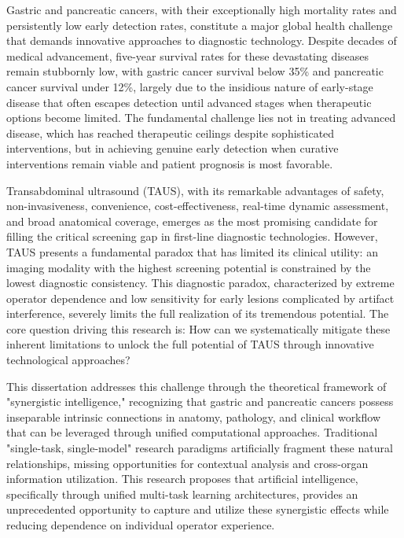 
Gastric and pancreatic cancers, with their exceptionally high mortality rates and persistently low early detection rates, constitute a major global health challenge that demands innovative approaches to diagnostic technology. Despite decades of medical advancement, five-year survival rates for these devastating diseases remain stubbornly low, with gastric cancer survival below 35\% and pancreatic cancer survival under 12\%, largely due to the insidious nature of early-stage disease that often escapes detection until advanced stages when therapeutic options become limited. The fundamental challenge lies not in treating advanced disease, which has reached therapeutic ceilings despite sophisticated interventions, but in achieving genuine early detection when curative interventions remain viable and patient prognosis is most favorable.

Transabdominal ultrasound (TAUS), with its remarkable advantages of safety, non-invasiveness, convenience, cost-effectiveness, real-time dynamic assessment, and broad anatomical coverage, emerges as the most promising candidate for filling the critical screening gap in first-line diagnostic technologies. However, TAUS presents a fundamental paradox that has limited its clinical utility: an imaging modality with the highest screening potential is constrained by the lowest diagnostic consistency. This diagnostic paradox, characterized by extreme operator dependence and low sensitivity for early lesions complicated by artifact interference, severely limits the full realization of its tremendous potential. The core question driving this research is: How can we systematically mitigate these inherent limitations to unlock the full potential of TAUS through innovative technological approaches?

This dissertation addresses this challenge through the theoretical framework of "synergistic intelligence," recognizing that gastric and pancreatic cancers possess inseparable intrinsic connections in anatomy, pathology, and clinical workflow that can be leveraged through unified computational approaches. Traditional "single-task, single-model" research paradigms artificially fragment these natural relationships, missing opportunities for contextual analysis and cross-organ information utilization. This research proposes that artificial intelligence, specifically through unified multi-task learning architectures, provides an unprecedented opportunity to capture and utilize these synergistic effects while reducing dependence on individual operator experience.

